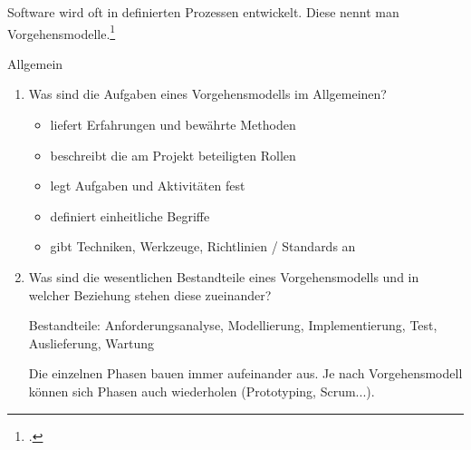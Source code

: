 \documentclass{bschlangaul-aufgabe}
\begin{document}

Software wird oft in definierten Prozessen entwickelt. Diese nennt man
Vorgehensmodelle.\footcite{examen:46116:2014:09}

\bigskip

\noindent
Allgemein

\begin{enumerate}


\item Was sind die Aufgaben eines Vorgehensmodells im Allgemeinen?

\begin{bAntwort}
\begin{itemize}
\item liefert Erfahrungen und bewährte Methoden
\item beschreibt die am Projekt beteiligten Rollen
\item legt Aufgaben und Aktivitäten fest
\item definiert einheitliche Begriffe
\item gibt Techniken, Werkzeuge, Richtlinien / Standards an
\end{itemize}
\end{bAntwort}


\item Was sind die wesentlichen Bestandteile eines
Vorgehensmodells und in welcher Beziehung stehen
diese zueinander?

\begin{bAntwort}
Bestandteile: Anforderungsanalyse, Modellierung, Implementierung, Test,
Auslieferung, Wartung

Die einzelnen Phasen bauen immer aufeinander aus. Je nach Vorgehensmodell
können sich Phasen auch wiederholen (Prototyping, Scrum...).
\end{bAntwort}

\end{enumerate}
\end{document}
